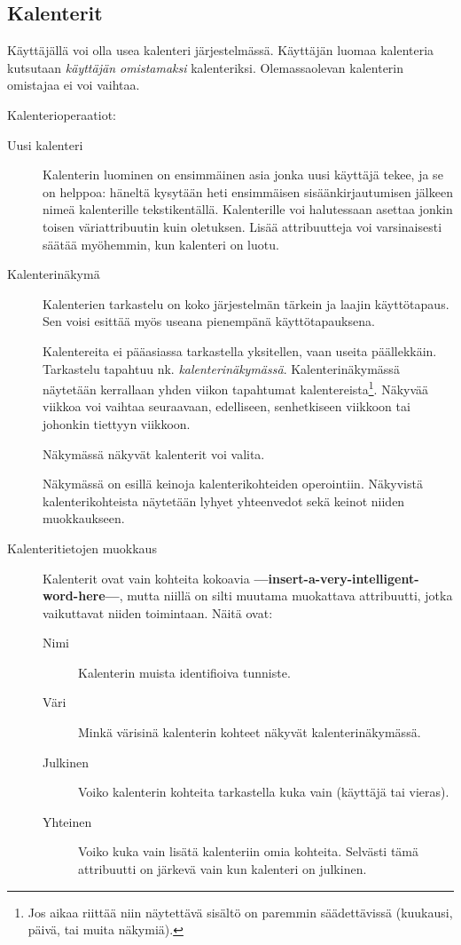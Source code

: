 \documentclass[a4paper,12pt]{report}
\begin{document}
\subsection{Kalenterit}\label{oma_kalenteri}
Käyttäjällä voi olla usea kalenteri järjestelmässä.  Käyttäjän luomaa kalenteria
kutsutaan \emph{käyttäjän omistamaksi} kalenteriksi.  Olemassaolevan kalenterin
omistajaa ei voi vaihtaa.

Kalenterioperaatiot:
\begin{description}
   \item[Uusi kalenteri] Kalenterin luominen on ensimmäinen asia jonka uusi
      käyttäjä tekee, ja se on helppoa: häneltä kysytään heti ensimmäisen
      sisäänkirjautumisen jälkeen nimeä kalenterille tekstikentällä.
      Kalenterille voi halutessaan asettaa jonkin toisen väriattribuutin kuin
      oletuksen.  Lisää attribuutteja voi varsinaisesti säätää myöhemmin, kun
      kalenteri on luotu.
   \item[Kalenterinäkymä]
      Kalenterien tarkastelu on koko järjestelmän tärkein ja laajin
      käyttötapaus.  Sen voisi esittää myös useana pienempänä käyttötapauksena.

      Kalentereita ei pääasiassa tarkastella yksitellen, vaan useita
      päällekkäin.  Tarkastelu tapahtuu nk.  \emph{kalenterinäkymässä}.
      Kalenterinäkymässä näytetään kerrallaan yhden viikon tapahtumat
      kalentereista\footnote{%
         Jos aikaa riittää niin näytettävä sisältö on paremmin säädettävissä
         (kuukausi, päivä, tai muita näkymiä).
      }.  Näkyvää viikkoa voi vaihtaa seuraavaan, edelliseen, senhetkiseen
      viikkoon tai johonkin tiettyyn viikkoon.

      Näkymässä näkyvät kalenterit voi valita.

      Näkymässä on esillä keinoja kalenterikohteiden operointiin.  Näkyvistä
      kalenterikohteista näytetään lyhyet yhteenvedot sekä keinot niiden
      muokkaukseen.
   \item[Kalenteritietojen muokkaus] Kalenterit ovat vain kohteita kokoavia
      \textbf{---insert-a-very-intelligent-word-here---}, mutta niillä on silti
      muutama muokattava attribuutti, jotka vaikuttavat niiden toimintaan. Näitä
      ovat:
      \begin{description}
         \item[Nimi]  Kalenterin muista identifioiva tunniste.
         \item[Väri]  Minkä värisinä kalenterin kohteet näkyvät
            kalenterinäkymässä.
         \item[Julkinen]  Voiko kalenterin kohteita tarkastella kuka vain
            (käyttäjä tai vieras).
         \item[Yhteinen]  Voiko kuka vain lisätä kalenteriin omia kohteita.
            Selvästi tämä attribuutti on järkevä vain kun kalenteri on
            julkinen.  
      \end{description}


\end{description}
\end{document}
